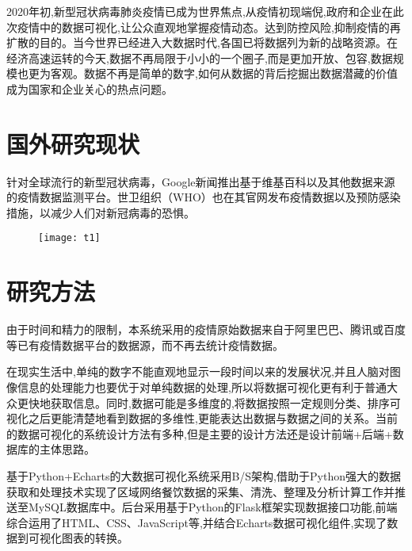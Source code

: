 2020年初,新型冠状病毒肺炎疫情已成为世界焦点,从疫情初现端倪,政府和企业在此次疫情中的数据可视化,让公众直观地掌握疫情动态。达到防控风险,抑制疫情的再扩散的目的。当今世界已经进入大数据时代,各国已将数据列为新的战略资源。在经济高速运转的今天,数据不再局限于小小的一个圈子,而是更加开放、包容,数据规模也更为客观。数据不再是简单的数字,如何从数据的背后挖掘出数据潜藏的价值成为国家和企业关心的热点问题。\citep{郭宏曦2020新型冠状病毒肺炎疫情数据的可视化探索}

\section{国外研究现状}

针对全球流行的新型冠状病毒，Google新闻推出基于维基百科以及其他数据来源的疫情数据监测平台。世卫组织（WHO）也在其官网发布疫情数据以及预防感染措施，以减少人们对新冠病毒的恐惧。

\begin{figure}[H]
    \centering
    \texttt{[image: t1]}
    \label{fig:t1}
\end{figure}

\section{研究方法}

由于时间和精力的限制，本系统采用的疫情原始数据来自于阿里巴巴、腾讯或百度等已有疫情数据平台的数据源，而不再去统计疫情数据。

在现实生活中,单纯的数字不能直观地显示一段时间以来的发展状况,并且人脑对图像信息的处理能力也要优于对单纯数据的处理,所以将数据可视化更有利于普通大众更快地获取信息。同时,数据可能是多维度的,将数据按照一定规则分类、排序可视化之后更能清楚地看到数据的多维性,更能表达出数据与数据之间的关系。当前的数据可视化的系统设计方法有多种,但是主要的设计方法还是设计前端+后端+数据库的主体思路。\citep{韩洪勇2020基于}

基于Python+Echarts的大数据可视化系统采用B/S架构,借助于Python强大的数据获取和处理技术实现了区域网络餐饮数据的采集、清洗、整理及分析计算工作并推送至MySQL数据库中。后台采用基于Python的Flask框架实现数据接口功能,前端综合运用了HTML、CSS、JavaScript等,并结合Echarts数据可视化组件,实现了数据到可视化图表的转换。\citep{陈俊生2019基于}

